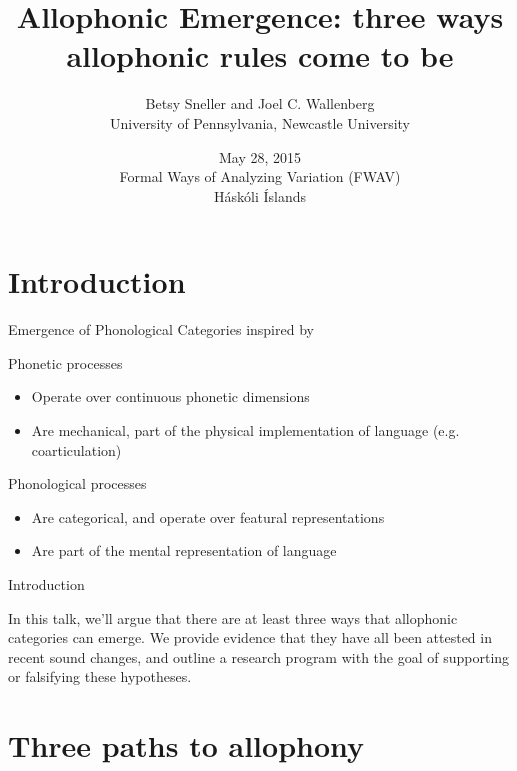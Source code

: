 \documentclass[hyperref={pdfpagelabels=false}]{beamer}
\title{Allophonic Emergence: three ways allophonic rules come to be}
\author{Betsy Sneller and Joel C. Wallenberg \\University of Pennsylvania, Newcastle University}
\institute{}
\date[]{May 28, 2015 \\ Formal Ways of Analyzing Variation (FWAV)\\ Háskóli Íslands}
\begin{document}
\begin{frame}[plain]
\titlepage
\end{frame}

\section{Introduction}
\begin{frame}{Emergence of Phonological Categories \small{inspired by\citep{fruehwald2013}}}
\begin{block}{Phonetic processes}
	\begin{itemize}
		\item Operate over continuous phonetic dimensions \pause
		\item Are mechanical, part of the physical implementation of language (e.g. coarticulation) \pause
	\end{itemize}
\end{block}

\begin{block}{Phonological processes}
	\begin{itemize}
		\item Are categorical, and operate over featural representations \pause
		\item Are part of the mental representation of language 
	\end{itemize}
\end{block}
			
\end{frame}

\begin{frame}{Introduction}

In this talk, we'll argue that there are at least three ways that allophonic categories can emerge. We provide evidence that they have all been attested in recent sound changes, and outline a research program with the goal of supporting or falsifying these hypotheses.

\end{frame}

\section[Outline]{}
\frame{\tableofcontents}

\section{Three paths to allophony}
\end{document}
